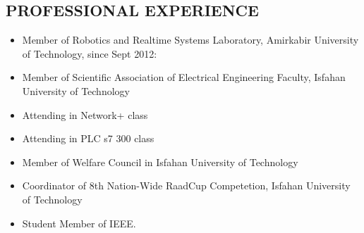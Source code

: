 \documentclass[margin,11pt]{res}
\begin{document}
\begin{resume}
\section{PROFESSIONAL EXPERIENCE}
\begin{itemize}
\item Member of Robotics and Realtime Systems Laboratory, Amirkabir University of Technology, since Sept 2012:
\item Member of Scientific Association of Electrical Engineering Faculty, Isfahan University of Technology
\item Attending in Network+ class
\item Attending in PLC s7 300 class
\item Member of Welfare Council in Isfahan University of Technology
\item Coordinator of 8th Nation-Wide RaadCup Competetion, Isfahan University of Technology
\item Student Member of IEEE.
\end{itemize}

\end{resume} 
\end{document}
